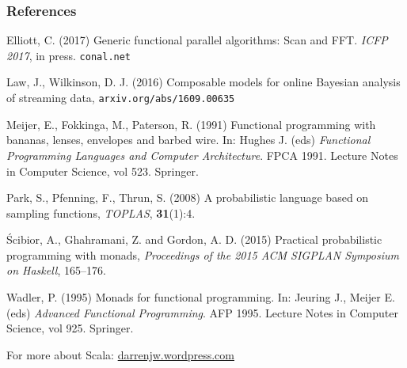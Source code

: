 \documentclass[mathserif,handout]{beamer}
\begin{document}
\begin{frame}
  \frametitle{References}
  \begin{thebibliography}{}

    \scriptsize

  \bibitem{} Elliott, C. (2017) \alert{Generic functional parallel algorithms: Scan and FFT}. \emph{ICFP 2017}, in press. \texttt{conal.net}

    \bibitem{} Law, J., Wilkinson, D. J. (2016) \alert{Composable models for online Bayesian analysis of streaming data}, \texttt{arxiv.org/abs/1609.00635}
    
    \bibitem{} Meijer, E., Fokkinga, M., Paterson, R. (1991) \alert{Functional programming with bananas, lenses, envelopes and barbed wire}. In: Hughes J. (eds) \emph{Functional Programming Languages and Computer Architecture}. FPCA 1991. Lecture Notes in Computer Science, vol 523. Springer.

    \bibitem{} Park, S., Pfenning, F., Thrun, S. (2008) \alert{A probabilistic language based on sampling functions}, \emph{TOPLAS}, \textbf{31}(1):4.

   \'{S}cibior, A., Ghahramani, Z. and Gordon, A. D. (2015) \alert{Practical probabilistic programming with monads}, \emph{Proceedings of the 2015 ACM SIGPLAN Symposium on Haskell}, 165--176.

     \bibitem{} Wadler, P. (1995) \alert{Monads for functional programming}. In: Jeuring J., Meijer E. (eds) \emph{Advanced Functional Programming}. AFP 1995. Lecture Notes in Computer Science, vol 925. Springer.
    
%
    
  \end{thebibliography}

  
For more about Scala: \alert{\url{darrenjw.wordpress.com}}

\end{frame}
\end{document}

